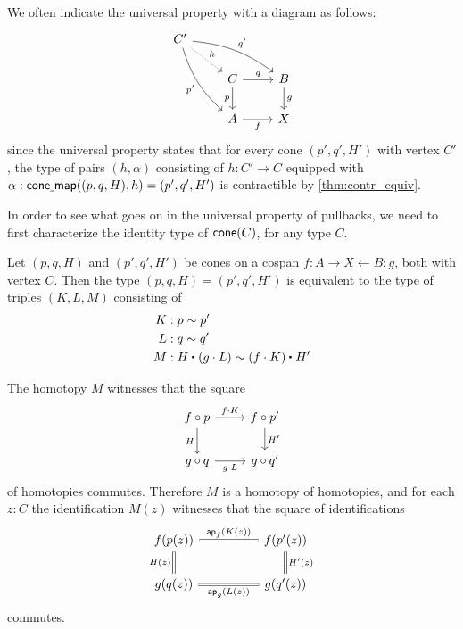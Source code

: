 We often indicate the universal property with a diagram as follows:
\begin{equation*}
\begin{tikzcd}
C' \arrow[drr,bend left=15,"{q'}"] \arrow[dr,densely dotted,"h"] \arrow[ddr,bend right=15,swap,"{p'}"] \\
& C \arrow[r,"q"] \arrow[d,swap,"p"] & B \arrow[d,"g"] \\
& A \arrow[r,swap,"f"] & X
\end{tikzcd}
\end{equation*}
since the universal property states that for every cone $(p',q',H')$ with vertex $C'$, the type of pairs $(h,\alpha)$ consisting of $h:C'\to C$ equipped with $\alpha:\mathsf{cone\underline{\ }{}map}((p,q,H),h)=(p',q',H')$ is contractible by \cref{thm:contr_equiv}.

In order to see what goes on in the universal property of pullbacks, we need to first characterize the identity type of $\mathsf{cone}(C)$, for any type $C$.

\begin{lem}\label{lem:id_cone}%
%
Let $(p,q,H)$ and $(p',q',H')$ be cones on a cospan $f:A\rightarrow X \leftarrow B:g$, both with vertex $C$. Then the type $(p,q,H)=(p',q',H')$ is equivalent to the type of triples $(K,L,M)$ consisting of
\begin{align*}
K & : p \htpy p' \\
L & : q \htpy q' \\
M & : \ct{H}{(g\cdot L)} \htpy \ct{(f\cdot K)}{H'}
\end{align*}
\end{lem}

\begin{rmk}
The homotopy $M$ witnesses that the square
\begin{equation*}
\begin{tikzcd}
f\circ p \arrow[r,"f\cdot K"] \arrow[d,swap,"H"] & f\circ p' \arrow[d,"{H'}"] \\
g\circ q \arrow[r,swap,"g\cdot L"] & g\circ q'
\end{tikzcd}
\end{equation*}
of homotopies commutes. Therefore $M$ is a homotopy of homotopies, and for each $z:C$ the identification $M(z)$ witnesses that the square of identifications
\begin{equation*}
\begin{tikzcd}[column sep=huge]
f(p(z)) \arrow[r,equals,"\ap{f}{K(z)}"] \arrow[d,equals,swap,"H(z)"] & f(p'(z)) \arrow[d,equals,"{H'(z)}"] \\
g(q(z)) \arrow[r,equals,swap,"\ap{g}{L(z)}"] & g(q'(z))
\end{tikzcd}
\end{equation*}
commutes. 
\end{rmk}

